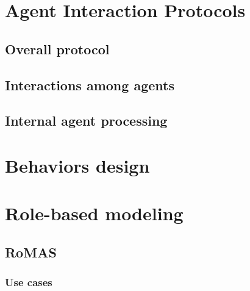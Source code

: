 \documentclass[a4paper,11pt]{report}
\begin{document}
  
  
  
  
  \section{Agent Interaction Protocols} %
  
  
  \subsection{Overall protocol} %
  
  
  \subsection{Interactions among agents}
  
  
  \subsection{Internal agent processing}


  
  
  \section{Behaviors design} %
  

  
  
  \section{Role-based modeling} %
  
  \subsection{RoMAS}
  
  \subsubsection{Use cases}
   
\end{document}

